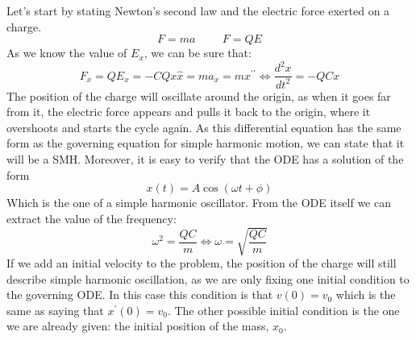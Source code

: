 \documentclass{report}
\begin{document}
\clearpage
{}
  \noindent Let's start by stating Newton's second law and the electric force exerted on a charge.
  \[F=ma \hspace{1cm} F=QE\]
  \noindent As we know the value of $E_x$, we can be sure that:
  \[F_x=QE_x=-CQx\hat{x}=ma_x=mx^{\prime\prime}\Longleftrightarrow\boxed{\dfrac{d^2x}{dt^2}=-QCx}\]
  \noindent The position of the charge will oscillate around the origin, as when it goes far from it, the electric force appears and pulls it back to the origin, where it overshoots and starts the cycle again. As this differential equation has the same form as the governing equation for simple harmonic motion, we can state that it will be a SMH. Moreover, it is easy to verify that the ODE has a solution of the form
  \[x(t)=A\cos(\omega t+\phi)\]
  \noindent Which is the one of a simple harmonic oscillator. From the ODE itself we can extract the value of the frequency:
  \[\omega^2=\dfrac{QC}{m}\Longleftrightarrow \boxed{\omega=\sqrt{\dfrac{QC}{m}}}\]
  \noindent If we add an initial velocity to the problem, the position of the charge will still describe simple harmonic oscillation, as we are only fixing one initial condition to the governing ODE. In this case this condition is that $v(0)=v_0$ which is the same as saying that $x^\prime(0)=v_0$. The other possible initial condition is the one we are already given: the initial position of the mass, $x_0$.
  
\end{document}
